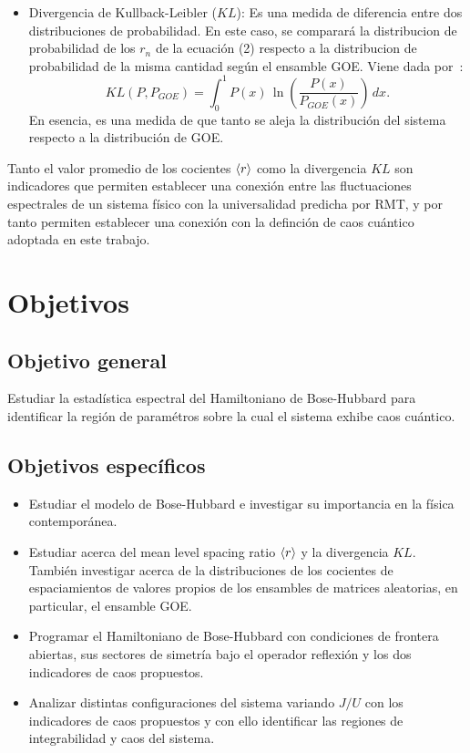 \documentclass[spanish,titlepage,table]{practicas}
\begin{document}
\begin{itemize}
    \item Divergencia de Kullback-Leibler ($KL$): Es una medida de diferencia entre dos distribuciones de probabilidad. En este caso, se comparará la distribucion de probabilidad de los $r_n$ de la ecuación (2)
    respecto a la distribucion de probabilidad de la misma cantidad según el ensamble GOE. Viene dada por~\cite{Pausch2022}:
    \begin{equation}
KL(P,P_{GOE}) = \int_{0}^{1} P(x) \, \ln \left( \frac{P(x)}{P_{GOE}(x)} \right) \, dx.
    \end{equation}
    En esencia, es una medida de que tanto se aleja la distribución del sistema respecto a la distribución de GOE.   
\end{itemize}
Tanto el valor promedio de los cocientes $\ev{r}$ como la divergencia $KL$ son indicadores que permiten establecer una conexión entre las fluctuaciones espectrales de un sistema físico 
con la universalidad predicha por RMT, y por tanto permiten establecer una conexión con la definción de caos cuántico adoptada en este trabajo.

\section{Objetivos}\label{sec:objetivos}
\subsection{Objetivo general}
  Estudiar la estadística espectral del Hamiltoniano de Bose-Hubbard para identificar la región de paramétros sobre la cual 
 el sistema exhibe caos cuántico.
 \subsection{Objetivos específicos}
  \begin{itemize}
    \item Estudiar el modelo de Bose-Hubbard e investigar su importancia en la física contemporánea.
    \item Estudiar acerca del mean level spacing ratio $\ev{r}$ y la divergencia $KL$. También investigar acerca de la distribuciones de los cocientes de espaciamientos de valores propios de los ensambles de matrices aleatorias, en particular, el ensamble GOE.
    \item Programar el Hamiltoniano de Bose-Hubbard con condiciones de frontera abiertas, sus sectores de simetría bajo el operador reflexión y los dos indicadores de caos propuestos.
    \item Analizar distintas configuraciones del sistema variando $J/U$ con los indicadores de caos propuestos y con ello identificar las regiones de integrabilidad y caos del sistema.
 \end{itemize}
 
\end{document}
